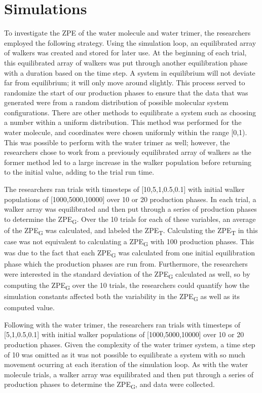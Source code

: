 \documentclass[journal=jacsat,manuscript=article]{achemso}
\begin{document}
\section{Simulations}

To investigate the ZPE of the water molecule and water trimer, the researchers employed the following strategy. Using the simulation loop, an equilibrated array of walkers was created and stored for later use. At the beginning of each trial, this equilibrated array of walkers was put through another equilibration phase with a duration based on the time step. A system in equilibrium will not deviate far from equilibrium; it will only move around slightly. This process served to randomize the start of our production phases to ensure that the data that was generated were from a random distribution of possible molecular system configurations. There are other methods to equilibrate a system such as choosing a number within a uniform distribution. This method was performed for the water molecule, and coordinates were chosen uniformly within the range [0,1). This was possible to perform with the water trimer as well;\cite{Roinou2020} however, the researchers chose to work from a previously equilibrated array of walkers as the former method led to a large increase in the walker population before returning to the initial value, adding to the trial run time. 

The researchers ran trials with timesteps of [10,5,1,0.5,0.1] with initial walker populations of [1000,5000,10000] over 10 or 20 production phases. In each trial, a walker array was equilibrated and then put through a series of production phases to determine the ZPE\textsubscript{G}. Over the 10 trials for each of these variables, an average of the ZPE\textsubscript{G} was calculated, and labeled the ZPE\textsubscript{T}. Calculating the ZPE\textsubscript{T} in this case was not equivalent to calculating a ZPE\textsubscript{G} with 100 production phases. This was due to the fact that each ZPE\textsubscript{G} was calculated from one initial equilibration phase which the production phases are run from. Furthermore, the researchers were interested in the standard deviation of the ZPE\textsubscript{G} calculated as well, so by computing the ZPE\textsubscript{G} over the 10 trials, the researchers could quantify how the simulation constants affected both the variability in the ZPE\textsubscript{G} as well as its computed value.

Following with the water trimer, the researchers ran trials with timesteps of [5,1,0.5,0.1] with initial walker populations of [1000,5000,10000] over 10 or 20 production phases. Given the complexity of the water trimer system, a time step of 10 was omitted as it was not possible to equilibrate a system with so much movement ocurring at each iteration of the simulation loop. As with the water molecule trials, a walker array was equilibrated and then put through a series of production phases to determine the ZPE\textsubscript{G}, and data were collected.
\end{document}
